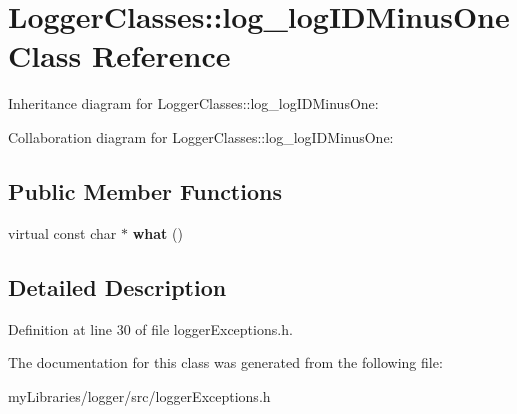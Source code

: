 \hypertarget{classLoggerClasses_1_1log__logIDMinusOne}{}\section{Logger\+Classes\+::log\+\_\+log\+I\+D\+Minus\+One Class Reference}
\label{classLoggerClasses_1_1log__logIDMinusOne}


Inheritance diagram for Logger\+Classes\+::log\+\_\+log\+I\+D\+Minus\+One\+:


Collaboration diagram for Logger\+Classes\+::log\+\_\+log\+I\+D\+Minus\+One\+:
\subsection*{Public Member Functions}
\begin{DoxyCompactItemize}
\item 
\mbox{\label{classLoggerClasses_1_1log__logIDMinusOne_adcab5bdc754aa6cc5e6deaf6c29bbf3f}} 
virtual const char $\ast$ {\bfseries what} ()
\end{DoxyCompactItemize}


\subsection{Detailed Description}


Definition at line 30 of file logger\+Exceptions.\+h.



The documentation for this class was generated from the following file\+:\begin{DoxyCompactItemize}
\item 
my\+Libraries/logger/src/logger\+Exceptions.\+h\end{DoxyCompactItemize}
